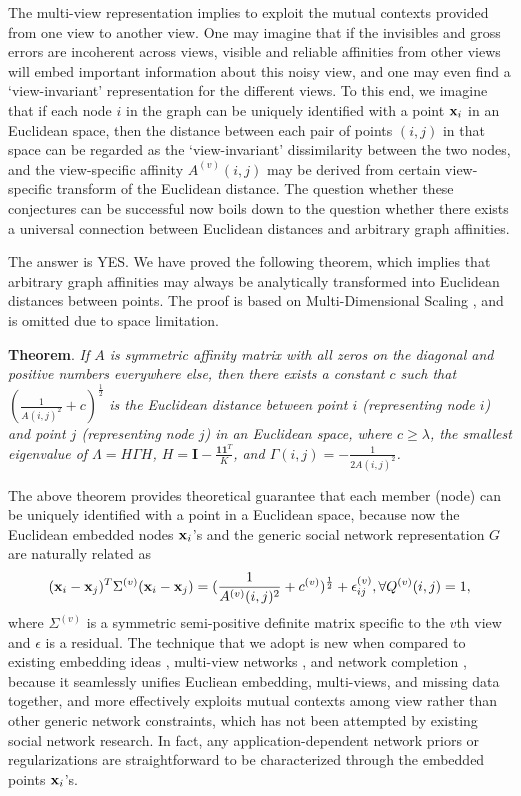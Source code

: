 The multi-view representation implies to exploit the mutual contexts provided from one view to another view. One may imagine that if the invisibles and gross errors are incoherent across views, visible and reliable affinities from other views will embed important information about this noisy view, and one may even find a `view-invariant' representation for the different views. To this end, we imagine that if each node $i$ in the graph can be uniquely identified with a point ${\bf x}_i$ in an Euclidean space, then the distance between each pair of points $(i,j)$ in that space can be regarded as the `view-invariant' dissimilarity between the two nodes, and the view-specific affinity $A^{(v)}(i,j)$ may be derived from certain view-specific transform of the Euclidean distance. The question whether these conjectures can be successful now boils down to the question whether there exists a universal connection between Euclidean distances and arbitrary graph affinities.

The answer is YES. We have proved the following theorem, which implies that arbitrary graph affinities may always be analytically transformed into Euclidean distances between points. The proof is based on Multi-Dimensional Scaling \cite{CoxMDS}, and is omitted due to space limitation.

\vspace{5pt}
\textbf{Theorem}. \textit{If $A$ is symmetric affinity matrix with all zeros on the diagonal and positive numbers everywhere else, then there exists a constant $c$ such that $(\frac{1}{A(i,j)^2}+c)^{\frac{1}{2}}$ is the Euclidean distance between point $i$ (representing node $i$) and point $j$ (representing node $j$) in an Euclidean space, where $c\geq\lambda$, the smallest eigenvalue of $\Lambda=H\Gamma H$, $H=\mathbf{I}-\frac{\mathbf{1}\mathbf{1}^T}{K}$, and $\Gamma(i,j)=-\frac{1}{2A(i,j)^2}$.} 
\vspace{5pt}


The above theorem provides theoretical guarantee that each member (node) can be uniquely identified with a point in a Euclidean space, because now the Euclidean embedded nodes ${\bf x}_i$'s and the generic social network representation $G$ are naturally related as
\begin{equation}\label{eq:embed}
({\bf x}_i-{\bf x}_j)^{T}\Sigma^{(v)}({\bf x}_i-{\bf x}_j)=(\frac{1}{A^{(v)}(i,j)^2}+c^{(v)})^{\frac{1}{2}}+\epsilon^{(v)}_{ij}, \forall Q^{(v)}(i,j)=1,
\end{equation}
where $\Sigma^{(v)}$ is a symmetric semi-positive definite matrix specific to the $v$th view and $\epsilon$ is a residual. The technique that we adopt is new when compared to existing embedding ideas \cite{Hoff01latentspace,Hancocklatent}, multi-view networks \cite{AiroldiBFX08,Kim12}, and network completion \cite{Clauset,Guimera,HannekeX09,KimL11}, because it seamlessly unifies Eucliean embedding, multi-views, and missing data together, and more effectively exploits mutual contexts among view rather than other generic network constraints, which has not been attempted by existing social network research. In fact, any application-dependent network priors or regularizations are straightforward to be characterized through the embedded points ${\bf x}_i$'s. 


